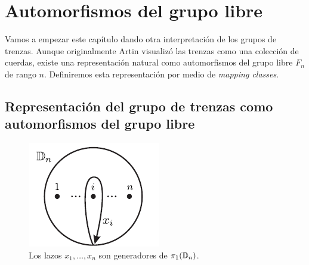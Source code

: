 \documentclass[TFG.tex]{subfiles}
\begin{document}
\chapter{Automorfismos del grupo libre}\label{capitulo1}

Vamos a empezar este capítulo dando otra interpretación de los grupos de trenzas. Aunque originalmente Artin visualizó las trenzas como una colección de cuerdas, existe una representación natural como automorfismos del grupo libre $F_n$ de rango $n$. Definiremos esta representación por medio de \emph{mapping classes}.

\section{Representación del grupo de trenzas como automorfismos del grupo libre}

\begin{figure}[h!]
\includegraphics[scale=0.7]{Imagenes/Disco.png}
\caption{Los lazos $x_1,\dots,x_n$ son generadores de $\pi_1(\mathbb{D}_n)$.}\label{disco}
\end{figure}
\end{document}
